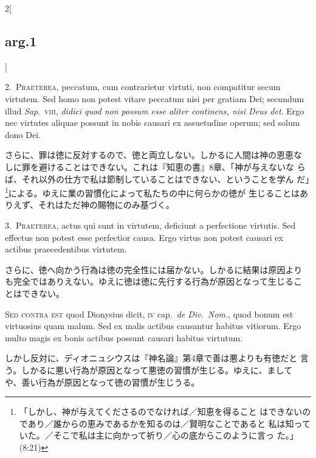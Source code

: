 \documentclass[paper=a4paper,fontsize=10pt,jafontsize=9pt,titlepage]{jlreq}
\begin{document}
\begin{paracol}{2}[\subsection{arg.1}]

2.~{\scshape Praeterea}, peccatum, cum contrarietur virtuti, non
compatitur secum virtutem. Sed homo non potest vitare peccatum nisi
per gratiam Dei; secundum illud {\itshape Sap}.~{\scshape viii},
{\itshape didici quod non possum esse aliter continens, nisi Deus
det}. Ergo nec virtutes aliquae possunt in nobis causari ex
assuetudine operum; sed solum dono Dei.

\switchcolumn

さらに、罪は徳に反対するので、徳と両立しない。しかるに人間は神の恩恵な
しに罪を避けることはできない。これは『知恵の書』8章、「神が与えないな
らば、それ以外の仕方で私は節制していることはできない、ということを学ん
だ」\footnote{「しかし、神が与えてくださるのでなければ／知恵を得ること
はできないのであり／誰からの恵みであるかを知るのは／賢明なことであると
私は知っていた。／そこで私は主に向かって祈り／心の底からこのように言っ
た。」(8:21)}による。ゆえに業の習慣化によって私たちの中に何らかの徳が
生じることはありえず、それはただ神の賜物にのみ基づく。


3.~{\scshape Praeterea}, actus qui sunt in virtutem, deficiunt a
perfectione virtutis. Sed effectus non potest esse perfectior
causa. Ergo virtus non potest causari ex actibus praecedentibus
virtutem.

\switchcolumn

さらに、徳へ向かう行為は徳の完全性には届かない。しかるに結果は原因より
も完全ではありえない。ゆえに徳は徳に先行する行為が原因となって生じるこ
とはできない。

\switchcolumn*[\subsection{s.c.}]

{\scshape Sed contra est} quod Dionysius dicit, {\scshape iv}
cap.~{\itshape de Div.~Nom}., quod bonum est virtuosius quam
malum. Sed ex malis actibus causantur habitus vitiorum. Ergo multo
magis ex bonis actibus possunt causari habitus virtutum.

\switchcolumn

しかし反対に、ディオニュシウスは『神名論』第4章で善は悪よりも有徳だと
言う。しかるに悪い行為が原因となって悪徳の習慣が生じる。ゆえに、まして
や、善い行為が原因となって徳の習慣が生じうる。


\end{paracol}
\end{document}
